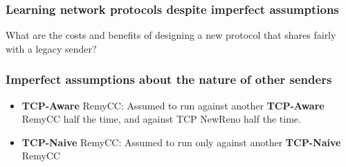 \begin{frame}
\frametitle{Learning network protocols despite imperfect assumptions}
\begin{centering}
What are the costs and benefits of designing a new protocol that shares fairly with a legacy sender?
\end{centering}
\end{frame}

\begin{frame}
\frametitle{Imperfect assumptions about the nature of other senders}
\begin{itemize}
\item<1-> \textbf{TCP-Aware} RemyCC: Assumed to run against another \textbf{TCP-Aware} RemyCC half the time, and against TCP NewReno half the time.
\item<2-> \textbf{TCP-Naive} RemyCC: Assumed to run only against another \textbf{TCP-Naive} RemyCC
\end{itemize}
\end{frame}

